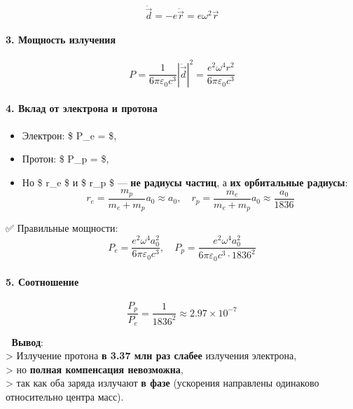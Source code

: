 \documentclass[11pt]{article}
\providecommand{\tightlist}{%
      \setlength{\itemsep}{0pt}\setlength{\parskip}{0pt}}
\begin{document}
\[
\ddot{\vec{d}} = -e \ddot{\vec{r}} = e \omega^2 \vec{r}
\]

\paragraph{3. Мощность
излучения}\label{ux43cux43eux449ux43dux43eux441ux442ux44c-ux438ux437ux43bux443ux447ux435ux43dux438ux44f}

\[
P = \frac{1}{6\pi\varepsilon_0 c^3} |\ddot{\vec{d}}|^2 = \frac{e^2 \omega^4 r^2}{6\pi\varepsilon_0 c^3}
\]

\paragraph{4. Вклад от электрона и
протона}\label{ux432ux43aux43bux430ux434-ux43eux442-ux44dux43bux435ux43aux442ux440ux43eux43dux430-ux438-ux43fux440ux43eux442ux43eux43dux430}

\begin{itemize}
\tightlist
\item
  Электрон: \$ P\_e = 
  \$,
\item
  Протон: \$ P\_p = 
  \$,
\item
  Но \$ r\_e \$ и \$ r\_p \$ --- \textbf{не радиусы частиц}, а
  \textbf{их орбитальные радиусы}: \[
    r_e = \frac{m_p}{m_e + m_p} a_0 \approx a_0, \quad r_p = \frac{m_e}{m_e + m_p} a_0 \approx \frac{a_0}{1836}
    \]
\end{itemize}

✅ Правильные мощности: \[
P_e = \frac{e^2 \omega^4 a_0^2}{6\pi\varepsilon_0 c^3}, \quad P_p = \frac{e^2 \omega^4 a_0^2}{6\pi\varepsilon_0 c^3 \cdot 1836^2}
\]

\paragraph{5.
Соотношение}\label{ux441ux43eux43eux442ux43dux43eux448ux435ux43dux438ux435}

\[
\frac{P_p}{P_e} = \frac{1}{1836^2} \approx 2.97 \times 10^{-7}
\]

📌 \textbf{Вывод}:\\
\textgreater{} Излучение протона \textbf{в 3.37 млн раз слабее}
излучения электрона,\\
\textgreater{} но \textbf{полная компенсация невозможна},\\
\textgreater{} так как оба заряда излучают \textbf{в фазе} (ускорения
направлены одинаково относительно центра масс).
\end{document}
